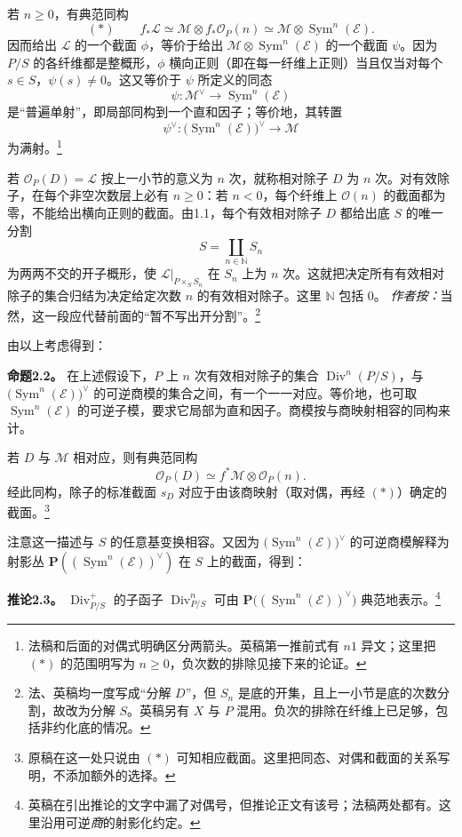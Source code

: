 \documentclass[openany,fontset=fandol]{ctexbook}
\newcommand{\OO}{\mathcal O}
\newcommand{\LL}{\mathcal L}
\newcommand{\MM}{\mathcal M}
\newcommand{\EE}{\mathcal E}
\DeclareMathOperator{\Sym}{Sym}
\DeclareMathOperator{\Div}{Div}
\begin{document}
若 \(n\ge0\)，有典范同构
\[
 (*)\qquad
 f_*\LL \simeq \MM\otimes f_*\OO_P(n)
             \simeq \MM\otimes\Sym^n(\EE).
\]
因而给出 \(\LL\) 的一个截面 \(\phi\)，等价于给出 \(\MM\otimes\Sym^n(\EE)\) 的一个截面 \(\psi\)。因为 \(P/S\) 的各纤维都是整概形，\(\phi\) 横向正则（即在每一纤维上正则）当且仅当对每个 \(s\in S\)，\(\psi(s)\ne0\)。这又等价于 \(\psi\) 所定义的同态
\[
 \psi:\MM^\vee\longrightarrow\Sym^n(\EE)
\]
是“普遍单射”，即局部同构到一个直和因子；等价地，其转置
\[
 \psi^\vee:\bigl(\Sym^n(\EE)\bigr)^\vee\longrightarrow\MM
\]
为满射。\footnote{法稿和后面的对偶式明确区分两箭头。英稿第一推前式有 \(n1\) 异文；这里把 \((*)\) 的范围明写为 \(n\ge0\)，负次数的排除见接下来的论证。}

若 \(\OO_P(D)=\LL\) 按上一小节的意义为 \(n\) 次，就称相对除子 \(D\) 为 \(n\) 次。对有效除子，在每个非空次数层上必有 \(n\ge0\)：若 \(n<0\)，每个纤维上 \(\OO(n)\) 的截面都为零，不能给出横向正则的截面。由1.1，每个有效相对除子 \(D\) 都给出底 \(S\) 的唯一分割
\[
 S=\coprod_{n\in\mathbb N}S_n
\]
为两两不交的开子概形，使 \(\LL|_{P\times_S S_n}\) 在 \(S_n\) 上为 \(n\) 次。这就把决定所有有效相对除子的集合归结为决定给定次数 \(n\) 的有效相对除子。这里 \(\mathbb N\) 包括 \(0\)。
\emph{作者按：}当然，这一段应代替前面的“暂不写出开分割”。\footnote{法、英稿均一度写成“分解 \(D\)”，但 \(S_n\) 是底的开集，且上一小节是底的次数分割，故改为分解 \(S\)。英稿另有 \(X\) 与 \(P\) 混用。负次的排除在纤维上已足够，包括非约化底的情况。}

由以上考虑得到：

\medskip\noindent\textbf{命题2.2。}
在上述假设下，\(P\) 上 \(n\) 次有效相对除子的集合 \(\Div^n(P/S)\)，与 \(\bigl(\Sym^n(\EE)\bigr)^\vee\) 的可逆商模的集合之间，有一个一一对应。等价地，也可取 \(\Sym^n(\EE)\) 的可逆子模，要求它局部为直和因子。商模按与商映射相容的同构来计。

若 \(D\) 与 \(\MM\) 相对应，则有典范同构
\[
 \OO_P(D)\simeq f^*\MM\otimes\OO_P(n).
\]
经此同构，除子的标准截面 \(s_D\) 对应于由该商映射（取对偶，再经 \((*)\)）确定的截面。\footnote{原稿在这一处只说由 \((*)\) 可知相应截面。这里把同态、对偶和截面的关系写明，不添加额外的选择。}

注意这一描述与 \(S\) 的任意基变换相容。又因为 \(\bigl(\Sym^n(\EE)\bigr)^\vee\) 的可逆商模解释为射影丛 \(\mathbf P((\Sym^n(\EE))^\vee)\) 在 \(S\) 上的截面，得到：

\medskip\noindent\textbf{推论2.3。}
\(\Div^+_{P/S}\) 的子函子 \(\Div^n_{P/S}\) 可由
\(\mathbf P\bigl((\Sym^n(\EE))^\vee\bigr)\) 典范地表示。\footnote{英稿在引出推论的文字中漏了对偶号，但推论正文有该号；法稿两处都有。这里沿用可逆\emph{商}的射影化约定。}
\end{document}
